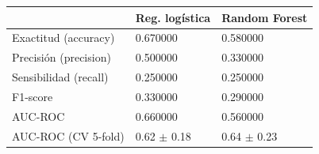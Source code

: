 \begin{tabular}{lll}
\toprule
 & Reg. logística & Random Forest \\
\midrule
Exactitud (accuracy) & 0.670000 & 0.580000 \\
Precisión (precision) & 0.500000 & 0.330000 \\
Sensibilidad (recall) & 0.250000 & 0.250000 \\
F1-score & 0.330000 & 0.290000 \\
AUC-ROC & 0.660000 & 0.560000 \\
AUC-ROC (CV 5-fold) & 0.62 $\pm$ 0.18 & 0.64 $\pm$ 0.23 \\
\bottomrule
\end{tabular}
